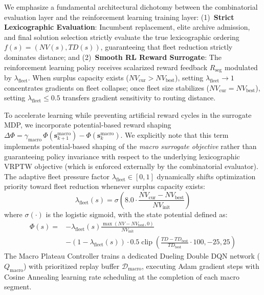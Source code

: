\documentclass{ieeeaccess}
\begin{document}
We emphasize a fundamental architectural dichotomy between the combinatorial evaluation layer and the reinforcement learning training layer: (1)~\textbf{Strict Lexicographic Evaluation}: Incumbent replacement, elite archive admission, and final solution selection strictly evaluate the true lexicographic ordering $f(s) = (NV(s), TD(s))$, guaranteeing that fleet reduction strictly dominates distance; and (2)~\textbf{Smooth RL Reward Surrogate}: The reinforcement learning policy receives scalarized reward feedback $R_{\text{seg}}$ modulated by $\lambda_{\text{fleet}}$. When surplus capacity exists ($NV_{\text{cur}} > NV_{\text{best}}$), setting $\lambda_{\text{fleet}} \to 1$ concentrates gradients on fleet collapse; once fleet size stabilizes ($NV_{\text{cur}} = NV_{\text{best}}$), setting $\lambda_{\text{fleet}} \le 0.5$ transfers gradient sensitivity to routing distance.

To accelerate learning while preventing artificial reward cycles in the surrogate MDP, we incorporate potential-based reward shaping $\Delta \Phi = \gamma_{\text{macro}}\,\Phi(\mathbf{s}_{k+1}^{\text{macro}}) - \Phi(\mathbf{s}_k^{\text{macro}})$. We explicitly note that this term implements potential-based shaping of the \emph{macro surrogate objective} \cite{ng1999policy} rather than guaranteeing policy invariance with respect to the underlying lexicographic VRPTW objective (which is enforced externally by the combinatorial evaluator). The adaptive fleet pressure factor $\lambda_{\text{fleet}} \in [0, 1]$ dynamically shifts optimization priority toward fleet reduction whenever surplus capacity exists:
\begin{equation}
  \lambda_{\text{fleet}}(s) = \sigma\!\left(8.0 \cdot \frac{NV_{\text{cur}} - NV_{\text{best}}}{NV_{\text{init}}}\right)
  \label{eq:lambda_fleet}
\end{equation}
where $\sigma(\cdot)$ is the logistic sigmoid, with the state potential defined as:
\begin{align}
  \Phi(s) = &-\lambda_{\text{fleet}}(s) \frac{\max(NV - NV_{\text{best}}, 0)}{NV_{\text{init}}} \nonumber \\
  &- (1 - \lambda_{\text{fleet}}(s)) \cdot 0.5 \operatorname{clip}\!\left(\frac{TD - TD_{\text{best}}}{TD_{\text{best}}} \cdot 100, -25, 25\right)
  \label{eq:potential_function}
\end{align}
The Macro Plateau Controller trains a dedicated Dueling Double DQN network ($Q_{\text{macro}}$) with prioritized replay buffer $\mathcal{D}_{\text{macro}}$, executing Adam gradient steps with Cosine Annealing learning rate scheduling at the completion of each macro segment.
\end{document}
